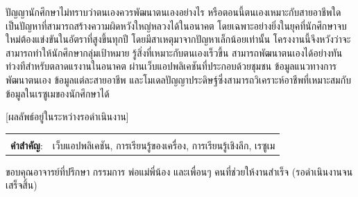 \documentclass[12pt,oneside,openright,a4paper]{cpe-thai-project}
\begin{document}
ปัญญานักศึกษาไม่ทราบว่าตนเองควรพัฒนาตนเองอย่างไร หรือตอนนี้ตนเองเหมาะกับสายอาชีพใด เป็นปัญหาที่สามารถสร้างความผิดหวังใหญ่หลวงได้ในอนาคต
โดยเฉพาะอย่างยิ่งในยุคที่นักศึกษาจบใหม่ต้องแข่งขันในอัตราที่สูงขึ้นทุกปี โดยมีสาเหตุมาจากปัญหาเล็กน้อยเท่านั้น โครงงานนี้จึงหวังว่าจะสามารถทำให้นักศึกษากลุ่มเป้าหมาย
รู้สิ่งที่เหมาะกับตนเองเร็วขึ้น สามารถพัฒนาตนเองได้อย่างทันท่วงทีสำหรับตลาดแรงานในอนาคต ผ่านเว็บแอปพลิเคชันที่ประกอบด้วยชุมชน ข้อมูลแนวทางการพัฒนาตนเอง ข้อมูลแต่ละสายอาชีพ
และโมเดลปัญญาประดิษฐ์ซึ่งสามารถวิเคราะห์อาชีพที่เหมาะสมกับข้อมูลในเรซูเมของนักศึกษาได้

[ผลลัพธ์อยู่ในระหว่างรอดำเนินงาน]

\begin{flushleft}
    \begin{tabular*}{\textwidth}{@{}lp{}}
        & \\

        \textbf{คำสำคัญ}: & เว็บแอปพลิเคชัน, การเรียนรู้ของเครื่อง, การเรียนรู้เชิงลึก, เรซูเม
    \end{tabular*}
\end{flushleft}
\endabstract


\preface
ขอบคุณอาจารย์ที่ปรึกษา กรรมการ พ่อแม่พี่น้อง และเพื่อนๆ คนที่ช่วยให้งานสำเร็จ (รอดำเนินงานจนเสร็จสิ้น)

\tableofcontents
\listoftables
\listoffigures
\end{document}
